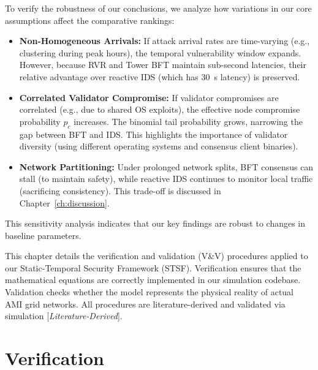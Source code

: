 \documentclass[12pt, oneside, a4paper]{report}
\theoremstyle{definition}
\theoremstyle{remark}
\newcommand{\litderived}{[\textit{Literature-Derived}]}
\begin{document}
To verify the robustness of our conclusions, we analyze how variations in our core assumptions affect the comparative rankings:
\begin{itemize}
  \item \textbf{Non-Homogeneous Arrivals:} If attack arrival rates are time-varying (e.g., clustering during peak hours), the temporal vulnerability window expands. However, because RVR and Tower BFT maintain sub-second latencies, their relative advantage over reactive IDS (which has 30~s latency) is preserved.
  \item \textbf{Correlated Validator Compromise:} If validator compromises are correlated (e.g., due to shared OS exploits), the effective node compromise probability $p_c$ increases. The binomial tail probability grows, narrowing the gap between BFT and IDS. This highlights the importance of validator diversity (using different operating systems and consensus client binaries).
  \item \textbf{Network Partitioning:} Under prolonged network splits, BFT consensus can stall (to maintain safety), while reactive IDS continues to monitor local traffic (sacrificing consistency). This trade-off is discussed in Chapter~\ref{ch:discussion}.
\end{itemize}
This sensitivity analysis indicates that our key findings are robust to changes in baseline parameters.




This chapter details the verification and validation (V\&V) procedures applied to our Static-Temporal Security Framework (STSF). Verification ensures that the mathematical equations are correctly implemented in our simulation codebase. Validation checks whether the model represents the physical reality of actual AMI grid networks. All procedures are literature-derived and validated via simulation \litderived.

\section{Verification}
\label{sec:vv:verification}
\end{document}
